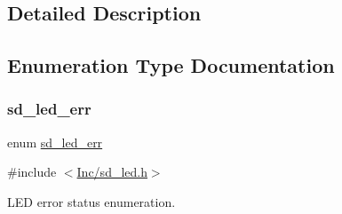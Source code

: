 \subsection{Detailed Description}


\subsection{Enumeration Type Documentation}
\mbox{\label{group___s_d___l_e_d___types_ga4f347a1003b4089de88a7f0fc62c1071}} 
\subsubsection{\texorpdfstring{sd\+\_\+led\+\_\+err}{sd\_led\_err}}
{\footnotesize\ttfamily enum \mbox{\hyperlink{group___s_d___l_e_d___types_ga4f347a1003b4089de88a7f0fc62c1071}{sd\+\_\+led\+\_\+err}}}



{\ttfamily \#include $<$\mbox{\hyperlink{sd__led_8h}{Inc/sd\+\_\+led.\+h}}$>$}



L\+ED error status enumeration. 

